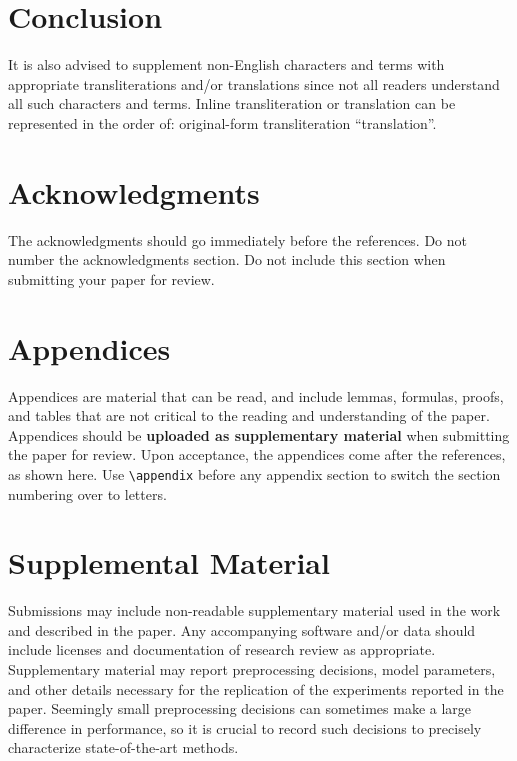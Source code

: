 \documentclass[11pt,a4paper]{article}
\begin{document}

\section{Conclusion}

It is also advised to supplement non-English characters and terms
with appropriate transliterations and/or translations
since not all readers understand all such characters and terms.
Inline transliteration or translation can be represented in
the order of: original-form transliteration ``translation''.

\section*{Acknowledgments}

The acknowledgments should go immediately before the references.  Do
not number the acknowledgments section. Do not include this section
when submitting your paper for review. \\


\appendix

\section{Appendices}
\label{sec:appendix}
Appendices are material that can be read, and include lemmas, formulas, proofs, and tables that are not critical to the reading and understanding of the paper. 
Appendices should be \textbf{uploaded as supplementary material} when submitting the paper for review. Upon acceptance, the appendices come after the references, as shown here. Use
\verb|\appendix| before any appendix section to switch the section
numbering over to letters.


\section{Supplemental Material}
\label{sec:supplemental}
Submissions may include non-readable supplementary material used in the work and described in the paper. Any accompanying software and/or data should include licenses and documentation of research review as appropriate. Supplementary material may report preprocessing decisions, model parameters, and other details necessary for the replication of the experiments reported in the paper. Seemingly small preprocessing decisions can sometimes make a large difference in performance, so it is crucial to record such decisions to precisely characterize state-of-the-art methods. 
\end{document}
